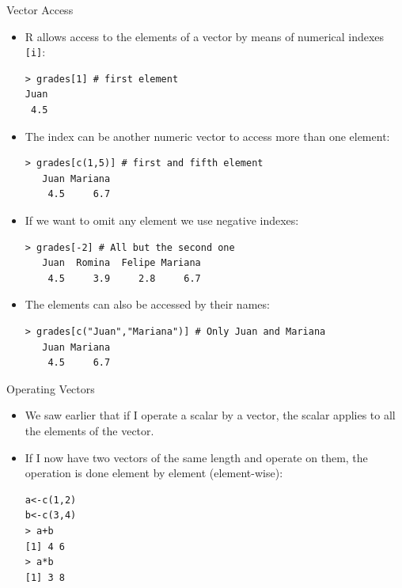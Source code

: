 \documentclass[handout]{beamer}
\begin{document}
\begin{frame}[fragile]{Vector Access}
\scriptsize{
\begin{itemize}

 \item R allows access to the elements of a vector by means of numerical indexes \verb+[i]+: 
\begin{verbatim}
> grades[1] # first element
Juan 
 4.5
\end{verbatim}

\item The index can be another numeric vector to access more than one element:
\begin{verbatim}
> grades[c(1,5)] # first and fifth element
   Juan Mariana 
    4.5     6.7 
\end{verbatim}

\item If we want to omit any element we use negative indexes:
\begin{verbatim}
> grades[-2] # All but the second one
   Juan  Romina  Felipe Mariana 
    4.5     3.9     2.8     6.7 
\end{verbatim}

\item The elements can also be accessed by their names:
\begin{verbatim}
> grades[c("Juan","Mariana")] # Only Juan and Mariana
   Juan Mariana 
    4.5     6.7 
\end{verbatim}



\end{itemize}

 

 }
\end{frame}


\begin{frame}[fragile]{Operating Vectors}
\scriptsize{
\begin{itemize}
 \item We saw earlier that if I operate a scalar by a vector, the scalar applies to all the elements of the vector.
 \item If I now have two vectors of the same length and operate on them, the operation is done element by element (element-wise):
\begin{verbatim}
a<-c(1,2)
b<-c(3,4)
> a+b
[1] 4 6
> a*b
[1] 3 8
\end{verbatim}

\end{itemize}
 }
\end{frame}
\end{document}
